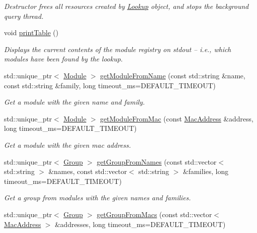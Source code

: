 \begin{DoxyCompactItemize}
\begin{DoxyCompactList}\small\item\em Destructor frees all resources created by \hyperlink{classhebi_1_1Lookup}{Lookup} object, and stops the background query thread. \end{DoxyCompactList}\item 
void \hyperlink{classhebi_1_1Lookup_a52e3d10c45ac8b6c47a7944fee1d7189}{print\+Table} ()
\begin{DoxyCompactList}\small\item\em Displays the current contents of the module registry on stdout -- i.\+e., which modules have been found by the lookup. \end{DoxyCompactList}\item 
std\+::unique\+\_\+ptr$<$ \hyperlink{classhebi_1_1Module}{Module} $>$ \hyperlink{classhebi_1_1Lookup_aaee883fe7e060f0ea0638a09bc49f54b}{get\+Module\+From\+Name} (const std\+::string \&name, const std\+::string \&family, long timeout\+\_\+ms=D\+E\+F\+A\+U\+L\+T\+\_\+\+T\+I\+M\+E\+O\+UT)
\begin{DoxyCompactList}\small\item\em Get a module with the given name and family. \end{DoxyCompactList}\item 
std\+::unique\+\_\+ptr$<$ \hyperlink{classhebi_1_1Module}{Module} $>$ \hyperlink{classhebi_1_1Lookup_ad4078193d720554b57bfd47a46d35231}{get\+Module\+From\+Mac} (const \hyperlink{classhebi_1_1MacAddress}{Mac\+Address} \&address, long timeout\+\_\+ms=D\+E\+F\+A\+U\+L\+T\+\_\+\+T\+I\+M\+E\+O\+UT)
\begin{DoxyCompactList}\small\item\em Get a module with the given mac address. \end{DoxyCompactList}\item 
std\+::unique\+\_\+ptr$<$ \hyperlink{classhebi_1_1Group}{Group} $>$ \hyperlink{classhebi_1_1Lookup_adae9314e23d17ad53e26f146f4c256bf}{get\+Group\+From\+Names} (const std\+::vector$<$ std\+::string $>$ \&names, const std\+::vector$<$ std\+::string $>$ \&families, long timeout\+\_\+ms=D\+E\+F\+A\+U\+L\+T\+\_\+\+T\+I\+M\+E\+O\+UT)
\begin{DoxyCompactList}\small\item\em Get a group from modules with the given names and families. \end{DoxyCompactList}\item 
std\+::unique\+\_\+ptr$<$ \hyperlink{classhebi_1_1Group}{Group} $>$ \hyperlink{classhebi_1_1Lookup_aad6bf0015b82dbce0b4dde06e1b10f52}{get\+Group\+From\+Macs} (const std\+::vector$<$ \hyperlink{classhebi_1_1MacAddress}{Mac\+Address} $>$ \&addresses, long timeout\+\_\+ms=D\+E\+F\+A\+U\+L\+T\+\_\+\+T\+I\+M\+E\+O\+UT)

\end{DoxyCompactItemize}
